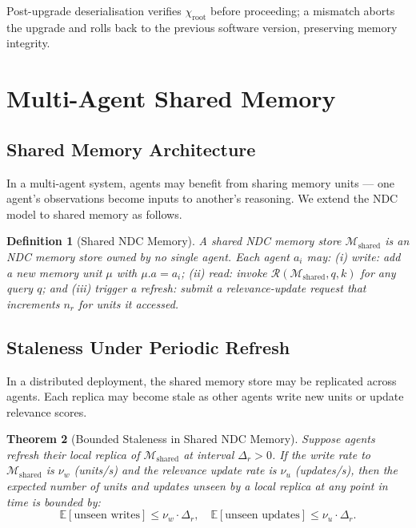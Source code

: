 \documentclass[12pt]{article}
\newtheorem{theorem}{Theorem}
\newtheorem{definition}[theorem]{Definition}
\newcommand{\MEM}{\mathcal{M}}
\begin{document}
Post-upgrade deserialisation verifies $\chi_\text{root}$ before proceeding;
a mismatch aborts the upgrade and rolls back to the previous software version,
preserving memory integrity.

\section{Multi-Agent Shared Memory}
\label{sec:multiagent}

\subsection{Shared Memory Architecture}

In a multi-agent system, agents may benefit from sharing memory units —
one agent's observations become inputs to another's reasoning.  We extend
the NDC model to shared memory as follows.

\begin{definition}[Shared NDC Memory]
  A \emph{shared NDC memory store} $\MEM_\text{shared}$ is an NDC memory store
  owned by no single agent.  Each agent $a_i$ may: (i) \emph{write}: add a new
  memory unit $\mu$ with $\mu.a = a_i$; (ii) \emph{read}: invoke
  $\mathcal{R}(\MEM_\text{shared}, q, k)$ for any query $q$; and
  (iii) \emph{trigger a refresh}: submit a relevance-update request that
  increments $n_r$ for units it accessed.
\end{definition}

\subsection{Staleness Under Periodic Refresh}

In a distributed deployment, the shared memory store may be replicated across
agents.  Each replica may become stale as other agents write new units or
update relevance scores.

\begin{theorem}[Bounded Staleness in Shared NDC Memory]
  Suppose agents refresh their local replica of $\MEM_\text{shared}$ at
  interval $\Delta_r > 0$.  If the write rate to $\MEM_\text{shared}$ is
  $\nu_w$ (units/s) and the relevance update rate is $\nu_u$ (updates/s), then
  the expected number of units and updates unseen by a local replica at any
  point in time is bounded by:
  \[
    \mathbb{E}[\text{unseen writes}] \le \nu_w \cdot \Delta_r, \quad
    \mathbb{E}[\text{unseen updates}] \le \nu_u \cdot \Delta_r.
  \]
\end{theorem}
\end{document}
